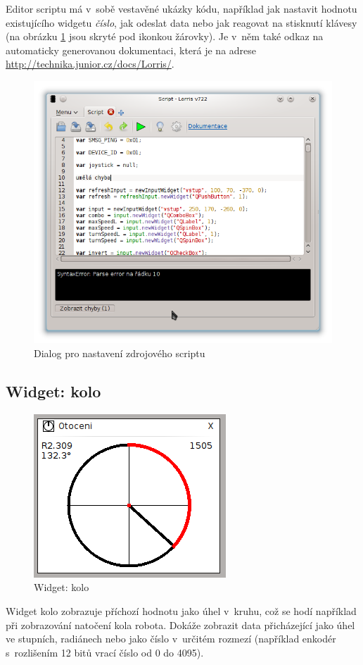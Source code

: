\documentclass[12pt, a4paper, oneside]{article}
\newcommand{\It}{\textit}  %
\begin{document}
Editor scriptu má v~sobě vestavěné ukázky kódu, například jak nastavit hodnotu existujícího widgetu \It{číslo}, jak odeslat data nebo jak reagovat na stisknutí klávesy (na obrázku \ref{script_src} jsou skryté pod ikonkou žárovky). Je v~něm také odkaz na automaticky generovanou dokumentaci, která je na adrese \url{http://technika.junior.cz/docs/Lorris/}.
\begin{figure}[h]
\begin{center}
\includegraphics[width=\textwidth]{img/w_script_src.png}
\caption{Dialog pro nastavení zdrojového scriptu}
\label{script_src}
\end{center}
\end{figure}

\subsection{Widget: kolo}
\begin{figure}[H]
\begin{center}
\includegraphics[scale=0.8]{img/w_circle.png}
\caption{Widget: kolo}
\end{center}
\end{figure}
Widget kolo zobrazuje příchozí hodnotu jako úhel v~kruhu, což se hodí například při zobrazování natočení kola robota. Dokáže zobrazit data přicházející jako úhel ve stupních, radiánech nebo jako číslo v~určitém rozmezí (například enkodér s~rozlišením 12 bitů vrací číslo od 0 do 4095).
\end{document}
